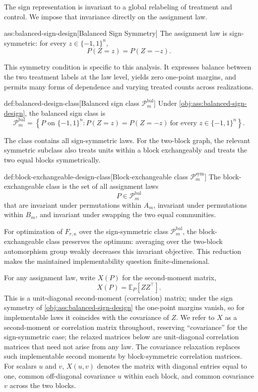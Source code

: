 \documentclass[11pt]{article}
\begin{document}
The sign representation is invariant to a global relabeling of treatment and control. We impose that invariance directly on the assignment law.

\begin{assumptionv}{ass:balanced-sign-design}[Balanced Sign Symmetry]
The assignment law is sign-symmetric: for every \(z\in\{-1,1\}^n\),
\[
P(Z=z)=P(Z=-z).
\]
\end{assumptionv}

This symmetry condition is specific to this analysis. It expresses balance between the two treatment labels at the law level, yields zero one-point margins, and permits many forms of dependence and varying treated counts across realizations.

\begin{definitionv}{def:balanced-design-class}[Balanced sign class $\mathcal P_m^{\mathrm{bal}}$]
Under \cref{obj:ass:balanced-sign-design}, the balanced sign class is
\[
\mathcal P_m^{\mathrm{bal}}
=
\left\{
P \text{ on } \{-1,1\}^n :
P(Z=z)=P(Z=-z)\ \text{for every } z\in\{-1,1\}^n
\right\}.
\]
\end{definitionv}

The class  contains all sign-symmetric laws. For the two-block graph, the relevant symmetric subclass also treats units within a block exchangeably and treats the two equal blocks symmetrically.

\begin{definitionv}{def:block-exchangeable-design-class}[Block-exchangeable class $\mathcal P_m^{\mathrm{sym}}$]
The block-exchangeable class is the set of all assignment laws
\[
P\in \mathcal P_m^{\mathrm{bal}}
\]
that are invariant under permutations within $A_m$, invariant under permutations within $B_m$, and invariant under swapping the two equal communities.
\end{definitionv}

For optimization of $F_{r,\kappa}$ over the sign-symmetric class $\mathcal P_m^{\mathrm{bal}}$, the block-exchangeable class  preserves the optimum: averaging over the two-block automorphism group weakly decreases this invariant objective. This reduction makes the maintained implementability question finite-dimensional.

For any assignment law, write \(X(P)\) for the second-moment matrix,
\[
X(P)=\mathbb E_P[ZZ^\top].
\]
This is a unit-diagonal second-moment (correlation) matrix; under the sign symmetry of \cref{obj:ass:balanced-sign-design} the one-point margins vanish, so for implementable laws it coincides with the covariance of \(Z\). We refer to \(X\) as a second-moment or correlation matrix throughout, reserving ``covariance'' for the sign-symmetric case; the relaxed matrices below are unit-diagonal correlation matrices that need not arise from any law. The covariance relaxation replaces such implementable second moments by block-symmetric correlation matrices. For scalars \(u\) and \(v\), \(X(u,v)\) denotes the matrix with diagonal entries equal to one, common off-diagonal covariance \(u\) within each block, and common covariance \(v\) across the two blocks.
\end{document}

